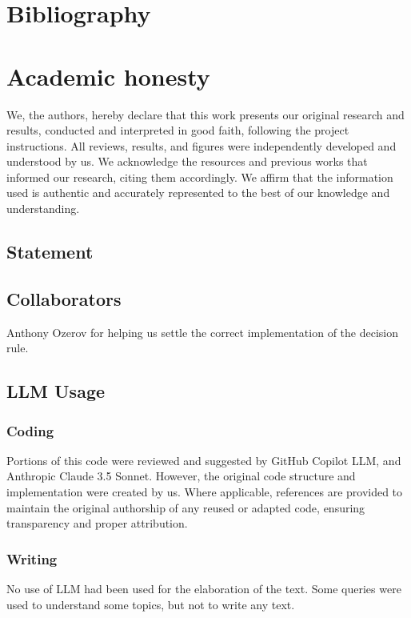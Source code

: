 \documentclass[10pt,letterpaper]{article}
\begin{document}
\newpage
\section{Bibliography}

 

\appendix
\section{Academic honesty}
We, the authors, hereby declare that this work presents our original research and results, conducted and interpreted in good faith, following the project instructions. All reviews, results, and figures were independently developed and understood by us. We acknowledge the resources and previous works that informed our research, citing them accordingly. We affirm that the information used is authentic and accurately represented to the best of our knowledge and understanding.

\subsection{Statement}

\subsection{Collaborators}
Anthony Ozerov for helping us settle the correct implementation of the decision rule.

\subsection{LLM Usage}

\subsubsection*{Coding}
Portions of this code were reviewed and suggested by GitHub Copilot LLM, and Anthropic Claude 3.5 Sonnet. However, the original code structure and implementation were created by us. Where applicable, references are provided to maintain the original authorship of any reused or adapted code, ensuring transparency and proper attribution.

\subsubsection*{Writing}
No use of LLM had been used for the elaboration of the text. Some queries were used to understand some topics, but not to write any text.
\end{document}
